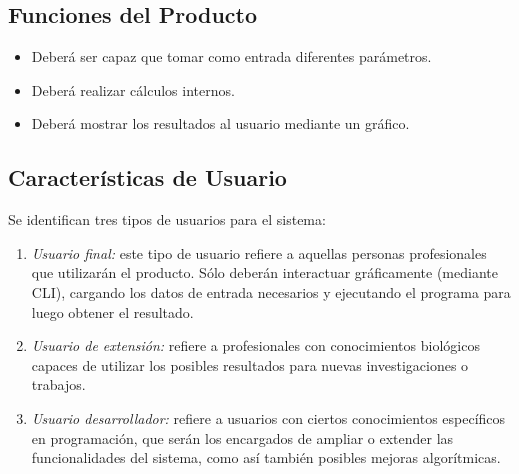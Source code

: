 \documentclass[12pt,a4paper,english,spanish]{article}
\begin{document}
\subsection{Funciones del Producto}
	\begin{itemize}
		\item Deberá ser capaz que tomar como entrada diferentes parámetros. %
		\item Deberá realizar cálculos internos.
		\item Deberá mostrar los resultados al usuario mediante un gráfico.
	\end{itemize}

\subsection{Características de Usuario}
	Se identifican tres tipos de usuarios para el sistema:
	\begin{enumerate}
 		\item \textit{Usuario final:} este tipo de usuario refiere a aquellas personas profesionales que utilizarán el 										producto. Sólo deberán interactuar gráficamente (mediante CLI), cargando los datos de entrada 										necesarios y ejecutando el programa para luego obtener el resultado. 
		\item \textit{Usuario de extensión:} refiere a profesionales con conocimientos biológicos capaces de utilizar los 												posibles resultados para nuevas investigaciones o trabajos.
		\item \textit{Usuario desarrollador:} refiere a usuarios con ciertos conocimientos específicos en programación, 											que serán los encargados de ampliar o extender las funcionalidades del 												sistema, como así también posibles mejoras algorítmicas.
	\end{enumerate}
\end{document}
